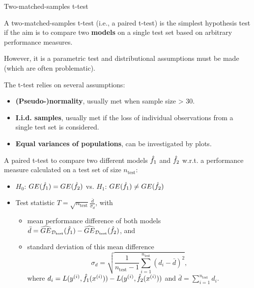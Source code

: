 \begin{vbframe}{Two-matched-samples t-test}

A two-matched-samples t-test (i.e., a paired t-test) is the simplest hypothesis test if the aim is to compare two \textbf{models} on a single test set based on arbitrary performance measures.

However, it is a parametric test and distributional assumptions must be made (which are often problematic).

\lz The t-test relies on several assumptions:

\begin{itemize}
\item \textbf{(Pseudo-)normality}, usually met when sample size > 30.
\item \textbf{I.i.d. samples}, usually met if the loss of individual observations from a single test set is considered. %
\item \textbf{Equal variances of populations}, can be investigated by plots.
\end{itemize}

\framebreak

A paired t-test to compare two different models $\hat{f}_1$ and $\hat{f}_2$ w.r.t. a performance measure calculated on a test set of size $n_{\text{test}}$:

\begin{itemize}
\item $H_0$: $GE(\hat{f}_{1}) = GE(\hat{f}_{2})$ vs. $H_1$: $GE(\hat{f}_{1}) \neq GE(\hat{f}_{2})$
\item Test statistic $T = \sqrt{n_{\text{test}}} \frac{\bar{d}}{\sigma_{d}}$, with
\begin{itemize}
\item mean performance difference of both models
$\bar{d} = \widehat{GE}_{\mathcal{D}_{\text{test}}}(\hat{f}_{1}) - \widehat{GE}_{\mathcal{D}_{\text{test}}}(\hat{f}_{2})$, and
\item standard deviation of this mean difference
$$\sigma_{d} = \sqrt{\frac{1}{n_{\text{test}} - 1}\sum_{i=1}^{n_{\text{test}}} \left(d_i - \bar{d} \right)^2},$$
where $d_i = L(y^{(i)}, \hat{f}_1 (x^{(i)})) - L(y^{(i)}, \hat{f}_2 (x^{(i)}))$ and $\bar{d} = \sum\limits_{i=1}^{n_{\text{test}}} d_i$.
\end{itemize}
\end{itemize}


\end{vbframe}
